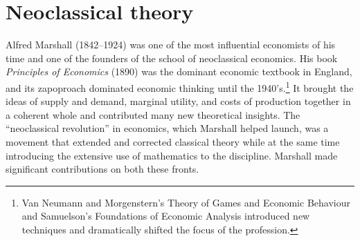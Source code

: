 
\section{Neoclassical theory }
Alfred Marshall (1842--1924) was one of the most influential economists of his time and one of the founders of the school of neoclassical economics. 
His book \textit{Principles of Economics} (1890) \cite{marshallPrinciplesEconomics1890} was the dominant economic textbook in England, and its zapoproach dominated economic thinking until the 1940's.\footnote{Van Neumann and Morgenstern’s Theory of Games and Economic Behaviour \cite{vonneumannTheoryGamesEconomic1967} and Samuelson’s Foundations of Economic Analysis \cite{samuelsonFoundationsEconomicAnalysis1983} introduced new techniques and dramatically shifted the focus of the profession.} It brought the ideas of supply and demand, marginal utility, and costs of production together in a coherent whole and contributed many new theoretical insights.
The ``neoclassical revolution'' in economics, which Marshall helped launch, was a movement that extended and corrected classical theory while at the same time introducing the extensive use of mathematics to the discipline. Marshall made significant contributions on both these fronts. 

